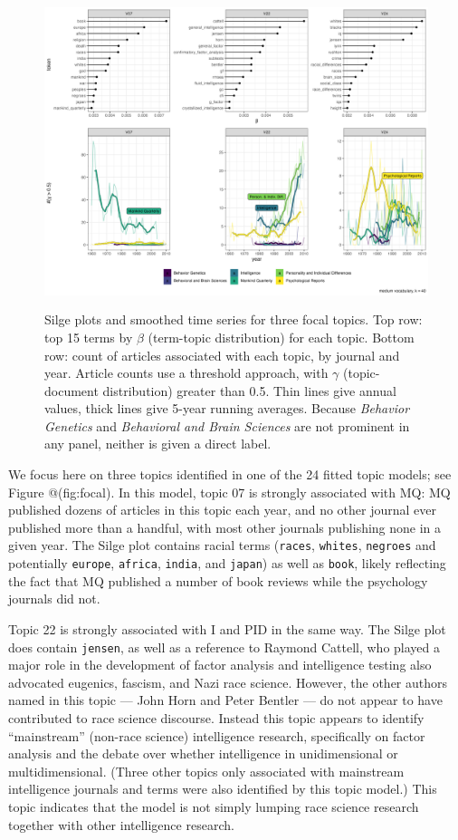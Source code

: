 \documentclass[12pt]{article}
\begin{document}
\begin{figure}
\centering
\includegraphics[width=4.76in,height=3.57in]{img/focal_topics.png}
\caption{Silge plots \cite{SilgeTopicModeling2017} and smoothed time series for three focal topics. Top row: top 15 terms by \(\beta\) (term-topic distribution) for each topic. Bottom row: count of articles associated with each topic, by journal and year. Article counts use a threshold approach, with \(\gamma\) (topic-document distribution) greater than 0.5. Thin lines give annual values, thick lines give 5-year running averages. Because \emph{Behavior Genetics} and \emph{Behavioral and Brain Sciences} are not prominent in any panel, neither is given a direct label. \label{fig:focal}}
\end{figure}

We focus here on three topics identified in one of the 24 fitted topic models; see Figure @(fig:focal). In this model, topic 07 is strongly associated with MQ: MQ published dozens of articles in this topic each year, and no other journal ever published more than a handful, with most other journals publishing none in a given year. The Silge plot \cite{SilgeTopicModeling2017} contains racial terms (\texttt{races}, \texttt{whites}, \texttt{negroes} and potentially \texttt{europe}, \texttt{africa}, \texttt{india}, and \texttt{japan}) as well as \texttt{book}, likely reflecting the fact that MQ published a number of book reviews while the psychology journals did not.

Topic 22 is strongly associated with I and PID in the same way. The Silge plot does contain \texttt{jensen}, as well as a reference to Raymond Cattell, who played a major role in the development of factor analysis and intelligence testing also advocated eugenics, fascism, and Nazi race science\cite{MehlerBeyondismRaymondCattell1997}. However, the other authors named in this topic --- John Horn and Peter Bentler --- do not appear to have contributed to race science discourse. Instead this topic appears to identify ``mainstream'' (non-race science) intelligence research, specifically on factor analysis and the debate over whether intelligence in unidimensional or multidimensional. (Three other topics only associated with mainstream intelligence journals and terms were also identified by this topic model.) This topic indicates that the model is not simply lumping race science research together with other intelligence research.
\end{document}

